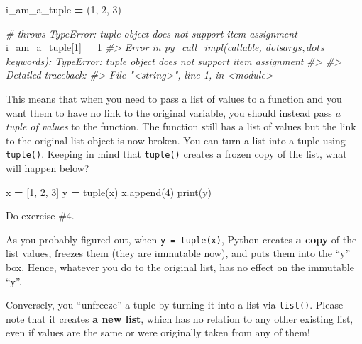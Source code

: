 \documentclass[
]{book}
\newenvironment{Shaded}{\begin{snugshade}}{\end{snugshade}}
\newcommand{\BuiltInTok}[1]{#1}
\newcommand{\CommentTok}[1]{\textcolor[rgb]{0.56,0.35,0.01}{\textit{#1}}}
\newcommand{\DecValTok}[1]{\textcolor[rgb]{0.00,0.00,0.81}{#1}}
\newcommand{\NormalTok}[1]{#1}
\newcommand{\OperatorTok}[1]{\textcolor[rgb]{0.81,0.36,0.00}{\textbf{#1}}}
\begin{document}
\begin{Shaded}
\begin{Highlighting}[]
\NormalTok{i\_am\_a\_tuple }\OperatorTok{=}\NormalTok{ (}\DecValTok{1}\NormalTok{, }\DecValTok{2}\NormalTok{, }\DecValTok{3}\NormalTok{)}

\CommentTok{\# throws TypeError: \textquotesingle{}tuple\textquotesingle{} object does not support item assignment}
\NormalTok{i\_am\_a\_tuple[}\DecValTok{1}\NormalTok{] }\OperatorTok{=} \DecValTok{1} 
\CommentTok{\#\textgreater{} Error in py\_call\_impl(callable, dots$args, dots$keywords): TypeError: \textquotesingle{}tuple\textquotesingle{} object does not support item assignment}
\CommentTok{\#\textgreater{} }
\CommentTok{\#\textgreater{} Detailed traceback:}
\CommentTok{\#\textgreater{}   File "\textless{}string\textgreater{}", line 1, in \textless{}module\textgreater{}}
\end{Highlighting}
\end{Shaded}

This means that when you need to pass a list of values to a function and you want them to have no link to the original variable, you should instead pass \emph{a tuple of values} to the function. The function still has a list of values but the link to the original list object is now broken. You can turn a list into a tuple using \texttt{tuple()}. Keeping in mind that \texttt{tuple()} creates a frozen copy of the list, what will happen below?

\begin{Shaded}
\begin{Highlighting}[]
\NormalTok{x }\OperatorTok{=}\NormalTok{ [}\DecValTok{1}\NormalTok{, }\DecValTok{2}\NormalTok{, }\DecValTok{3}\NormalTok{]}
\NormalTok{y }\OperatorTok{=} \BuiltInTok{tuple}\NormalTok{(x)}
\NormalTok{x.append(}\DecValTok{4}\NormalTok{)}
\BuiltInTok{print}\NormalTok{(y)}
\end{Highlighting}
\end{Shaded}

Do exercise \#4.

As you probably figured out, when \texttt{y\ =\ tuple(x)}, Python creates \textbf{a copy} of the list values, freezes them (they are immutable now), and puts them into the ``y'' box. Hence, whatever you do to the original list, has no effect on the immutable ``y''.

Conversely, you ``unfreeze'' a tuple by turning it into a list via \texttt{list()}. Please note that it creates \textbf{a new list}, which has no relation to any other existing list, even if values are the same or were originally taken from any of them!
\end{document}
